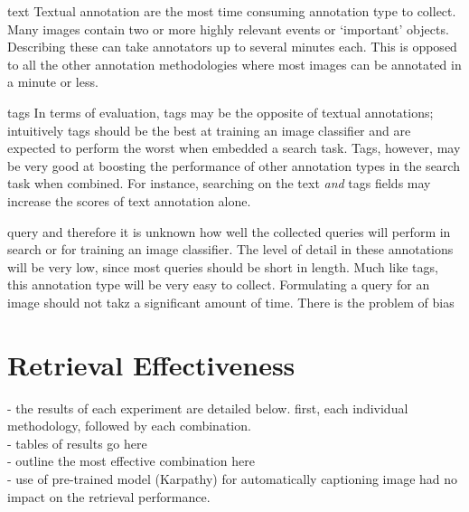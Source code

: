 text
Textual annotation are the most time consuming annotation type to collect. Many images contain two or more highly relevant events or `important' objects. Describing these can take annotators up to several minutes each. This is opposed to all the other annotation methodologies where most images can be annotated in a minute or less.

tags
In terms of evaluation, tags may be the opposite of textual annotations; intuitively tags should be the best at training an image classifier and are expected to perform the worst when embedded a search task. Tags, however, may be very good at boosting the performance of other annotation types in the search task when combined. For instance, searching on the text \textit{and} tags fields may increase the scores of text annotation alone.

query
and therefore it is unknown how well the collected queries will perform in search or for training an image classifier. The level of detail in these annotations will be very low, since most queries should be short in length.
Much like tags, this annotation type will be very easy to collect. Formulating a query for an image should not takz a significant amount of time. There is the problem of bias 

\section{Retrieval Effectiveness}

- the results of each experiment are detailed below. first, each individual methodology, followed by each combination.\\
- tables of results go here\\
- outline the most effective combination here\\
- use of pre-trained model (Karpathy) for automatically captioning image had no impact on the retrieval performance.

